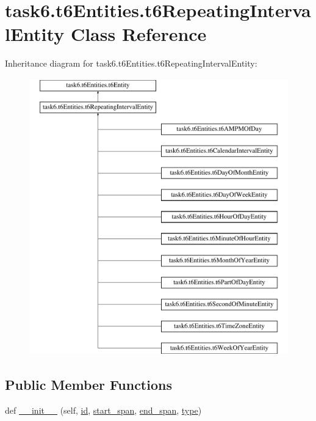 \hypertarget{classtask6_1_1t6Entities_1_1t6RepeatingIntervalEntity}{}\section{task6.\+t6\+Entities.\+t6\+Repeating\+Interval\+Entity Class Reference}
\label{classtask6_1_1t6Entities_1_1t6RepeatingIntervalEntity}
Inheritance diagram for task6.\+t6\+Entities.\+t6\+Repeating\+Interval\+Entity\+:\begin{figure}[H]
\begin{center}
\leavevmode
\includegraphics[height=12.000000cm]{classtask6_1_1t6Entities_1_1t6RepeatingIntervalEntity}
\end{center}
\end{figure}
\subsection*{Public Member Functions}
\begin{DoxyCompactItemize}
\item 
def \hyperlink{classtask6_1_1t6Entities_1_1t6RepeatingIntervalEntity_a2b821296d1afa9e5d79e3082a11e27d6}{\+\_\+\+\_\+init\+\_\+\+\_\+} (self, \hyperlink{classtask6_1_1t6Entities_1_1t6Entity_a96b2e7fb553c920ab2db6f6deb31e3b4}{id}, \hyperlink{classtask6_1_1t6Entities_1_1t6Entity_a8221c36d2995a24200cdfbd74cc9233c}{start\+\_\+span}, \hyperlink{classtask6_1_1t6Entities_1_1t6Entity_a597d42bb02fc9f42277098f0ce21917c}{end\+\_\+span}, \hyperlink{classtask6_1_1t6Entities_1_1t6Entity_af0496eb852234bb168ab22d031c99ed3}{type})
\end{DoxyCompactItemize}
